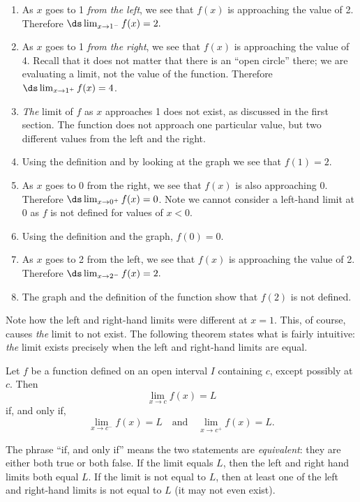 \begin{example}
\begin{enumerate}
	\item	As $x$ goes to 1 \emph{from the left}, we see that $f(x)$ is approaching the value of 2. Therefore $\ds \lim_{x\to 1^-} f(x) =2.$
	\item	As $x$ goes to 1 \emph{from the right}, we see that $f(x)$ is approaching the value of 4. Recall that it does not matter that there is an ``open circle'' there; we are evaluating a limit, not the value of the function. Therefore $\ds \lim_{x\to 1^+} f(x)=4$.
	\item	\emph{The} limit of $f$ as $x$ approaches 1 does not exist, as discussed in the first section. The function does not approach one particular value, but two different values from the left and the right.
	\item	Using the definition and by looking at the graph we see that $f(1) = 2$.
	\item	As $x$ goes to 0 from the right, we see that $f(x)$ is also approaching 0. Therefore $\ds \lim_{x\to 0^+} f(x)=0$. Note we cannot consider a left-hand limit at 0 as $f$ is not defined for values of $x<0$.
	\item	Using the definition and the graph, $f(0) = 0$.
	\item	As $x$ goes to 2 from the left, we see that $f(x)$ is approaching the value of 2. Therefore $\ds \lim_{x\to 2^-} f(x)=2.$
	\item	The graph and the definition of the function show that $f(2)$ is not defined.
\end{enumerate}
\end{example}

Note how the left and right-hand limits were different at $x=1$. This, of course, causes \emph{the} limit to not exist. The following theorem states what is fairly intuitive: \emph{the} limit exists precisely when the left and right-hand limits are equal.

\begin{theorem}\label{thm:leftrightlimits}%
Let $f$ be a function defined on an open interval $I$ containing $c$, except possibly at $c$.  Then\vspace{-.5\baselineskip}
\[\lim_{x\to c}f(x) = L\]
if, and only if,\vspace{-.5\baselineskip}
\[\lim_{x\to c^-}f(x) = L \quad \text{and} \quad \lim_{x\to c^+}f(x) = L.\]
\end{theorem}

The phrase ``if, and only if'' means the two statements are \emph{equivalent}: they are either both true or both false. If the limit equals $L$, then the left and right hand limits both equal $L$. If the limit is not equal to $L$, then at least one of the left and right-hand limits is not equal to $L$ (it may not even exist).
			
